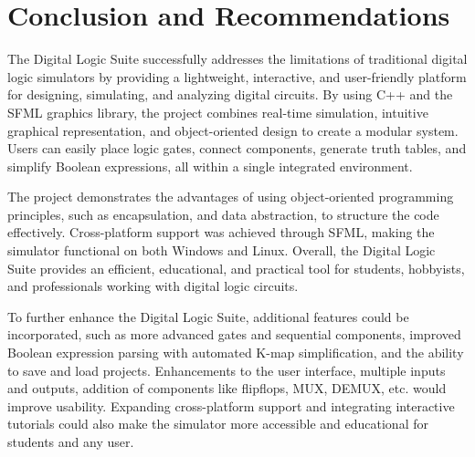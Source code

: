 \section{Conclusion and Recommendations}

The Digital Logic Suite successfully addresses the limitations of traditional digital logic simulators by providing a lightweight, interactive, and user-friendly platform for designing, simulating, and analyzing digital circuits. By using C++ and the SFML graphics library, the project combines real-time simulation, intuitive graphical representation, and object-oriented design to create a modular system. Users can easily place logic gates, connect components, generate truth tables, and simplify Boolean expressions, all within a single integrated environment.

\vspace{0.5cm}
The project demonstrates the advantages of using object-oriented programming principles, such as encapsulation, and data abstraction, to structure the code effectively. Cross-platform support was achieved through SFML, making the simulator functional on both Windows and Linux. Overall, the Digital Logic Suite provides an efficient, educational, and practical tool for students, hobbyists, and professionals working with digital logic circuits.

\vspace{0.5cm}
To further enhance the Digital Logic Suite, additional features could be incorporated, such as more advanced gates and sequential components, improved Boolean expression parsing with automated K-map simplification, and the ability to save and load projects. Enhancements to the user interface, multiple inputs and outputs, addition of components like flipflops, MUX, DEMUX, etc. would improve usability. Expanding cross-platform support and integrating interactive tutorials could also make the simulator more accessible and educational for students and any user.
\clearpage